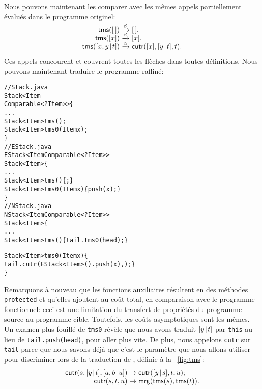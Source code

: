 Nous pouvons maintenant les comparer avec les mêmes appels
partiellement évalués dans le programme originel:
\begin{equation*}
\begin{array}{@{}r@{\;}l@{\;}l@{}}
\fun{tms}(\el) & \xrightarrow{\smash{\beta}} & \el.\\
\fun{tms}([x]) & \xrightarrow{\smash{\beta}} & [x].\\
\fun{tms}(\cons{x,y}{t}) & \xrightarrow{\smash{\alpha}}
                         & \fun{cutr}([x],\cons{y}{t},t).
\end{array}
\end{equation*}
Ces appels concourent et couvrent toutes les flèches dans toutes
définitions. Nous pouvons maintenant traduire le programme
raffiné:
\begin{alltt}
// Stack.java
\public \abstractX \class Stack<Item
\hfill\extends Comparable<? \super Item>> \{
  ...
  \public \abstractX Stack<Item> tms();
  \protectedX \abstractX Stack<Item> tms0(\final Item x);
\}
// EStack.java
\public \class EStack<Item \extends Comparable<? \super Item>>
       \extends Stack<Item> \{
  ...
  \public Stack<Item> tms() \{ \return \this; \}
  \protectedX Stack<Item> tms0(\final Item x) \{\return push(x);\}
\}
// NStack.java
\public \class NStack<Item \extends Comparable<? \super Item>>
       \extends Stack<Item> \{
  ...
  \public Stack<Item> tms() \{ \return tail.tms0(head); \}

  \protectedX Stack<Item> tms0(\final Item x) \{
    \return tail.cutr(\new EStack<Item>().push(x),\this); \}
\}
\end{alltt}
Remarquons à nouveau que les fonctions auxiliaires résultent en des
méthodes \texttt{protected} et qu'elles ajoutent au coût total, en
comparaison avec le programme fonctionnel: ceci est une limitation du
transfert de propriétés du programme source au programme
cible. Toutefois, les coûts asymptotiques sont les mêmes. Un examen
plus fouillé de \texttt{tms0} révèle que nous avons traduit
\([{y}\!\mid\!{t}]\) par \texttt{this} au lieu de \texttt{tail.push(head)},
pour aller plus vite. De plus, nous appelons \texttt{cutr} sur
\texttt{tail} parce que nous savons déjà que c'est le paramètre que
nous allons utiliser pour discriminer lors de la traduction de
, définie à la \fig~\vref{fig:tms}:
\begin{equation*}
\begin{array}{@{}r@{\;}l@{\;}l@{}}
\fun{cutr}(s,\cons{y}{t},\cons{a,b}{u})
                       & \rightarrow & \fun{cutr}(\cons{y}{s},t,u);\\
\fun{cutr}(s,t,u)      & \rightarrow
                       & \fun{mrg}(\fun{tms}(s),\fun{tms}(t)).
\end{array}
\end{equation*}
